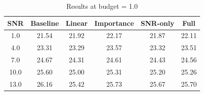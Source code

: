 \begin{table}[h]
\centering
\caption{Results at budget = 1.0}
\begin{tabular}{c|ccccc}
\hline
SNR & Baseline & Linear & Importance & SNR-only & Full \\
\hline
1.0 & 21.54 & 21.92 & 22.17 & 21.87 & 22.11 \\
4.0 & 23.31 & 23.29 & 23.57 & 23.32 & 23.51 \\
7.0 & 24.67 & 24.31 & 24.61 & 24.43 & 24.56 \\
10.0 & 25.60 & 25.00 & 25.31 & 25.20 & 25.26 \\
13.0 & 26.16 & 25.42 & 25.73 & 25.67 & 25.70 \\
\hline
\end{tabular}
\end{table}

